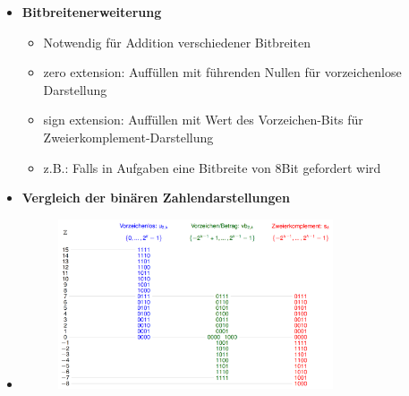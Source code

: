 \documentclass[11pt,a4paper]{article}
\begin{document}
\begin{itemize}
\begin{itemize}
\begin{itemize}
		\end{itemize}
	\end{itemize}
	
	\pagebreak	
	
\item \textbf{Bitbreitenerweiterung}
	\begin{itemize}
	\item Notwendig für Addition verschiedener Bitbreiten
	\item zero extension: Auffüllen mit führenden Nullen für vorzeichenlose Darstellung
	\item sign extension: Auffüllen mit Wert des Vorzeichen-Bits für Zweierkomplement-Darstellung
	\item z.B.: Falls in Aufgaben eine Bitbreite von 8Bit gefordert wird
	\end{itemize}

\item \textbf{Vergleich der binären Zahlendarstellungen}
\item[] \begin{figure}[H]
			\begin{center}
			\includegraphics[height=5cm]{compzahlen}
			\end{center}
		\end{figure}

\end{itemize}
\end{document}
